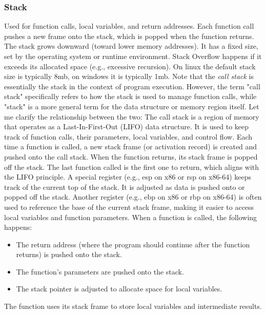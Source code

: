 \documentclass{report}
\begin{document}
\bigbreak \noindent 
\subsubsection{Stack}
\bigbreak \noindent 
Used for function calls, local variables, and return addresses. Each function call pushes a new frame onto the stack, which is popped when the function returns. The stack grows downward (toward lower memory addresses).
\bigbreak \noindent 
It has a fixed size, set by the operating system or runtime environment.
\bigbreak \noindent 
Stack Overflow happens if it exceeds its allocated space (e.g., excessive recursion).
\bigbreak \noindent 
On linux the default stack size is typically 8mb, on windows it is typically 1mb.
\bigbreak \noindent 
Note that the \textit{call stack} is essentially the stack in the context of program execution. However, the term "call stack" specifically refers to how the stack is used to manage function calls, while "stack" is a more general term for the data structure or memory region itself. Let me clarify the relationship between the two:
\bigbreak \noindent 
The call stack is a region of memory that operates as a Last-In-First-Out (LIFO) data structure. It is used to keep track of function calls, their parameters, local variables, and control flow. Each time a function is called, a new stack frame (or activation record) is created and pushed onto the call stack. When the function returns, its stack frame is popped off the stack.
\bigbreak \noindent 
The last function called is the first one to return, which aligns with the LIFO principle.
\bigbreak \noindent 
A special register (e.g., esp on x86 or rsp on x86-64) keeps track of the current top of the stack. It is adjusted as data is pushed onto or popped off the stack.
\bigbreak \noindent 
Another register (e.g., ebp on x86 or rbp on x86-64) is often used to reference the base of the current stack frame, making it easier to access local variables and function parameters.
\bigbreak \noindent 
When a function is called, the following happens:
\begin{itemize}
    \item The return address (where the program should continue after the function returns) is pushed onto the stack.
    \item The function's parameters are pushed onto the stack.
    \item The stack pointer is adjusted to allocate space for local variables.
\end{itemize}
\bigbreak \noindent 
The function uses its stack frame to store local variables and intermediate results.
\end{document}
